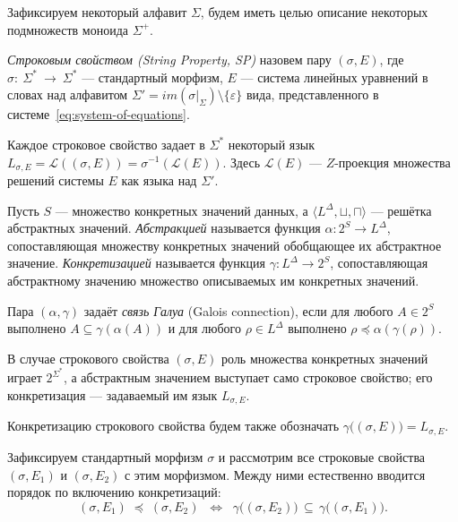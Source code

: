 \documentclass[fontsize=14pt]{scrartcl}
\newcommand{\Lang}{\mathcal{L}}
\begin{document}
\begin{Definition}
\label{def:string-property}
Зафиксируем некоторый алфавит $\Sigma$, будем иметь целью описание некоторых подмножеств моноида $\Sigma^+$.

\textit{Строковым свойством (String Property, SP)} назовем пару $(\sigma, E)$, где 
$\sigma:~\Sigma^*~\to~\Sigma^*$ --- стандартный морфизм, $E$ --- система линейных уравнений в словах над алфавитом $\Sigma' = im(\sigma|_{\Sigma}) \setminus \{\varepsilon\}$
вида, представленного в системе~\ref{eq:system-of-equations}.

Каждое строковое свойство задает в $\Sigma^*$ некоторый язык  $L_{\sigma, E} = \Lang((\sigma, E)) = \sigma^{-1}(\Lang(E))$.  
Здесь $\Lang(E)$ --- $Z$-проекция множества решений системы $E$ как языка над
$\Sigma'$.
\end{Definition}

\begin{Definition}
\label{def:abstraction-concretisation}
Пусть $S$ --- множество конкретных значений данных, а $\langle L^\Delta, \sqcup, \sqcap \rangle$ --- решётка абстрактных значений.
\emph{Абстракцией} называется функция $\alpha \colon 2^S \to L^\Delta$, сопоставляющая множеству конкретных значений обобщающее их абстрактное значение.
\emph{Конкретизацией} называется функция $\gamma \colon L^\Delta \to 2^S$, сопоставляющая абстрактному значению множество описываемых им конкретных значений.

Пара $(\alpha, \gamma)$ задаёт \emph{связь Галуа} (Galois connection), если для любого $A \in 2^S$ выполнено $A \subseteq \gamma(\alpha(A))$ и для любого $\rho \in L^\Delta$ выполнено $\rho \preceq \alpha(\gamma(\rho))$.
\end{Definition}

В случае строкового свойства $(\sigma, E)$ роль множества конкретных значений играет $2^{\Sigma^*}$, а абстрактным значением выступает само строковое свойство; его конкретизация --- задаваемый им язык $L_{\sigma, E}$.

Конкретизацию строкового свойства будем также обозначать
$\gamma\bigl((\sigma, E)\bigr) =  L_{\sigma, E}$.

Зафиксируем стандартный морфизм $\sigma$ и рассмотрим все строковые свойства
$(\sigma, E_1)$ и $(\sigma, E_2)$ с этим морфизмом. Между ними естественно вводится порядок по
включению конкретизаций:
\[
    (\sigma, E_1) \;\preceq\; (\sigma, E_2)
    \;\;\iff\;\;
    \gamma\bigl((\sigma, E_2)\bigr) \,\subseteq\, \gamma\bigl((\sigma, E_1)\bigr).
\]
\end{document}
